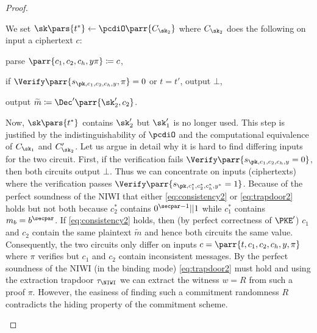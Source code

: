 \begin{proof}
\begin{hybrids}
        \item We set \(\sk\pars{t^*} \gets \pcdiO\parr{C_{\sk_2}}\) where \(C_{\sk_2}\) does the following on input a ciphertext \(c\):
        \begin{sitemize}
            \item parse \(\parr{c_1,c_2,c_h,y\pi} \coloneqq c\),
            \item if \(\Verify\parr{s_{\pk,c_1,c_2,c_h,y},\pi} = 0\) or \(t=t'\), output \(\bot\),
            \item output \(\widetilde{m} \coloneqq \Dec'\parr{\sk'_2,c_2}\).
        \end{sitemize}
        Now, \(\sk\pars{t^*}\) contains \(\sk'_2\) but \(\sk'_1\) is no longer used.
        This step is justified by the indistinguishability of \(\pcdiO\) and the computational equivalence of \(C_{\sk_1}\) and \(C'_{\sk_2}\).
        Let us argue in detail why it is hard to find differing inputs for the two circuit.
        First, if the verification fails \(\Verify\parr{s_{\pk,c_1,c_2,c_h,y} = 0}\),
        then both circuits output \(\bot\).
        Thus we can concentrate on inputs (ciphertexts) where the verification passes \(\Verify\parr{s_{\pk,c^*_1,c^*_2,c^*_h,y^*} = 1}\).
        Because of the perfect soundness of the NIWI that either \cref{eq:consistency2} or \cref{eq:trapdoor2} holds but not both because \(c^*_2\) contains \(0^{\secpar-1}||1\) while \(c^*_1\) contains \(m_b = b^\secpar\).
        If \cref{eq:consistency2} holds,
        then (by perfect correctness of \(\PKE'\)) \(c_1\) and \(c_2\) contain the same plaintext \(\widetilde{m}\) and hence both circuits the same value.
        \\
        Consequently, the two circuits only differ on inputs \(c = \parr{t,c_1,c_2,c_h,y,\pi}\) where \(\pi\) verifies but \(c_1\) and \(c_2\) contain inconsistent messages.
        By the perfect soundness of the NIWI (in the binding mode) \cref{eq:trapdoor2} must hold and using the extraction trapdoor \(\tau_\NIWI\) we can extract the witness \(w = R\) from such a proof \(\pi\).
        However, the easiness of finding such a commitment randomness \(R\) contradicts the hiding property of the commitment scheme.


\end{hybrids}
\end{proof}
